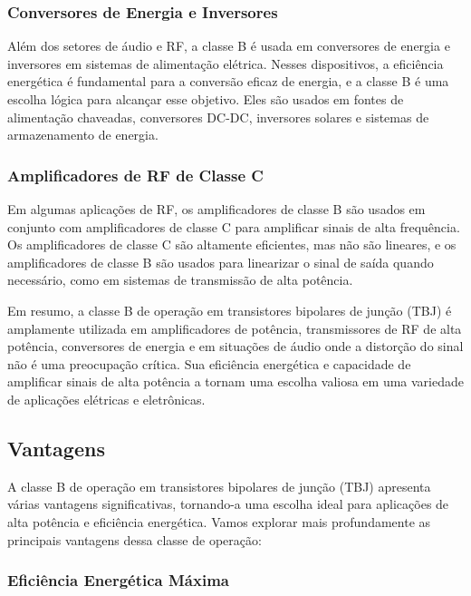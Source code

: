 \subsubsection{Conversores de Energia e Inversores}

Além dos setores de áudio e RF, a classe B é usada em conversores de energia e inversores em sistemas de alimentação elétrica. Nesses dispositivos, a eficiência energética é fundamental para a conversão eficaz de energia, e a classe B é uma escolha lógica para alcançar esse objetivo. Eles são usados em fontes de alimentação chaveadas, conversores DC-DC, inversores solares e sistemas de armazenamento de energia.

\subsubsection{Amplificadores de RF de Classe C}

Em algumas aplicações de RF, os amplificadores de classe B são usados em conjunto com amplificadores de classe C para amplificar sinais de alta frequência. Os amplificadores de classe C são altamente eficientes, mas não são lineares, e os amplificadores de classe B são usados para linearizar o sinal de saída quando necessário, como em sistemas de transmissão de alta potência.

Em resumo, a classe B de operação em transistores bipolares de junção (TBJ) é amplamente utilizada em amplificadores de potência, transmissores de RF de alta potência, conversores de energia e em situações de áudio onde a distorção do sinal não é uma preocupação crítica. Sua eficiência energética e capacidade de amplificar sinais de alta potência a tornam uma escolha valiosa em uma variedade de aplicações elétricas e eletrônicas.

\subsection{Vantagens}

A classe B de operação em transistores bipolares de junção (TBJ) apresenta várias vantagens significativas, tornando-a uma escolha ideal para aplicações de alta potência e eficiência energética. Vamos explorar mais profundamente as principais vantagens dessa classe de operação:

\subsubsection{Eficiência Energética Máxima}

